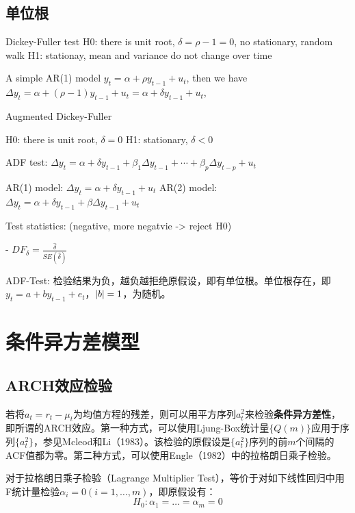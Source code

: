 \documentclass[11pt]{article}
\begin{document}
\subsection{单位根}

Dickey-Fuller test
H0: there is unit root, $\delta = \rho - 1 =0$, no stationary, random walk
H1: stationay, mean and variance do not change over time

A simple AR(1) model $y_t = \alpha + \rho y_{t-1} + u_t$, then we have $\Delta y_t = \alpha + (\rho -1) y_{t-1} + u_t = \alpha + \delta y_{t-1} + u_t$, 

Augmented Dickey-Fuller 

H0: there is unit root, $\delta = 0$
H1: stationary, $\delta < 0$

ADF test: $\Delta y_t = \alpha + \delta y_{t-1} + \beta_1 \Delta y_{t-1} + \cdots + \beta_{p} \Delta y_{t-p} + u_t$

AR(1) model: $\Delta y_t = \alpha + \delta y_{t-1} + u_t$
AR(2) model: $\Delta y_t = \alpha + \delta y_{t-1} + \beta \Delta y_{t-1} + u_t$

Test statistics: (negative, more negatvie -> reject H0)

-  $DF_{\delta} = \frac{\hat{\delta}}{SE(\hat{\delta})}$

ADF-Test: 检验结果为负，越负越拒绝原假设，即有单位根。单位根存在，即$y_t = a + b y_{t-1} + e_t$，$\left\lvert b\right\rvert =1$，为随机。

\section{条件异方差模型}

\subsection{ARCH效应检验}

若将$a_t = r_t - \mu_t$为均值方程的残差，则可以用平方序列$a_t^2$来检验\textbf{条件异方差性}，即所谓的ARCH效应。第一种方式，可以使用Ljung-Box统计量$\{Q(m)\}$应用于序列$\{a_t^2\}$，参见Mcleod和Li（1983）。该检验的原假设是$\{a_t^2\}$序列的前$m$个间隔的ACF值都为零。第二种方式，可以使用Engle（1982）中的拉格朗日乘子检验。

对于拉格朗日乘子检验（Lagrange Multiplier Test），等价于对如下线性回归中用F统计量检验$\alpha_i=0(i=1,\dots,m)$，即原假设有：
\begin{equation*}
    H_0: \alpha_1 = \dots = \alpha_m = 0
\end{equation*}
\end{document}
